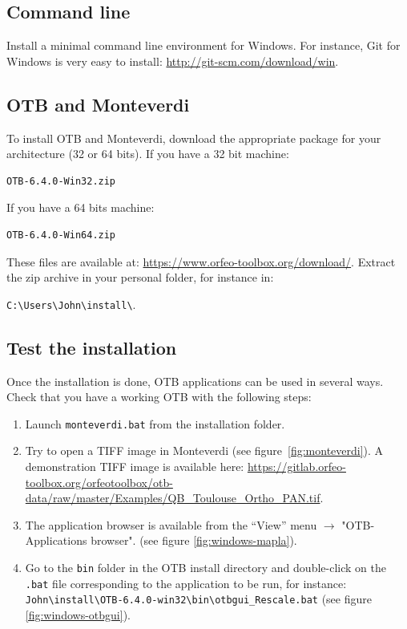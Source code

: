\documentclass[10pt,a4paper]{article}
\begin{document}
\subsection{Command line}
Install a minimal command line environment for Windows. For instance, Git for
Windows is very easy to install: \url{http://git-scm.com/download/win}.

\subsection{OTB and Monteverdi}
To install OTB and Monteverdi, download the appropriate package for your
architecture (32 or 64 bits). If you have a 32 bit machine:

\begin{verbatim}
OTB-6.4.0-Win32.zip
\end{verbatim}

If you have a 64 bits machine:

\begin{verbatim}
OTB-6.4.0-Win64.zip
\end{verbatim}

These files are available at:
\url{https://www.orfeo-toolbox.org/download/}.
Extract the zip archive in your personal folder, for instance in:\\
\begin{centering}
\texttt{C:{\textbackslash}Users{\textbackslash}John{\textbackslash}install{\textbackslash}}.
\end{centering}

\subsection{Test the installation}
Once the installation is done, OTB applications can be used in several ways. Check that you have a working OTB with the following steps:
\begin{enumerate}

\item Launch \texttt{monteverdi.bat} from the installation folder.

\item Try to open a TIFF image in Monteverdi (see
figure~\ref{fig:monteverdi}). A demonstration TIFF image is available here: \url{https://gitlab.orfeo-toolbox.org/orfeotoolbox/otb-data/raw/master/Examples/QB\_Toulouse\_Ortho\_PAN.tif}.

\item The application browser is available from the ``View'' menu 
$\rightarrow$ "OTB-Applications browser".
(see figure \ref{fig:windows-mapla}).

\item Go to the \texttt{bin} folder in the OTB install directory and double-click on the \texttt{.bat} file corresponding to the application to be run, for instance:\\
\texttt{John{\textbackslash}install{\textbackslash}OTB-6.4.0-win32{\textbackslash}bin{\textbackslash}otbgui\_Rescale.bat}
(see figure \ref{fig:windows-otbgui}).

\end{enumerate}
\end{document}
